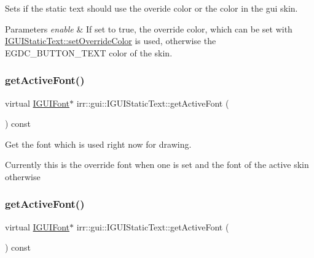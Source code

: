 Sets if the static text should use the overide color or the color in the gui skin. 


\begin{DoxyParams}{Parameters}
{\em enable} & If set to true, the override color, which can be set with \hyperlink{classirr_1_1gui_1_1IGUIStaticText_aadc1f0e10e4b298944e6dcfd49e54009}{I\+G\+U\+I\+Static\+Text\+::set\+Override\+Color} is used, otherwise the E\+G\+D\+C\+\_\+\+B\+U\+T\+T\+O\+N\+\_\+\+T\+E\+XT color of the skin. \\
\hline
\end{DoxyParams}
\mbox{\label{classirr_1_1gui_1_1IGUIStaticText_aef001eb5d0e13b5b6d1efead606605c2}} 
\subsubsection{\texorpdfstring{get\+Active\+Font()}{getActiveFont()}\hspace{0.1cm}{\footnotesize\ttfamily [1/2]}}
{\footnotesize\ttfamily virtual \hyperlink{classirr_1_1gui_1_1IGUIFont}{I\+G\+U\+I\+Font}$\ast$ irr\+::gui\+::\+I\+G\+U\+I\+Static\+Text\+::get\+Active\+Font (\begin{DoxyParamCaption}{ }\end{DoxyParamCaption}) const\hspace{0.3cm}{\ttfamily [pure virtual]}}



Get the font which is used right now for drawing. 

Currently this is the override font when one is set and the font of the active skin otherwise \mbox{\label{classirr_1_1gui_1_1IGUIStaticText_aef001eb5d0e13b5b6d1efead606605c2}} 
\subsubsection{\texorpdfstring{get\+Active\+Font()}{getActiveFont()}\hspace{0.1cm}{\footnotesize\ttfamily [2/2]}}
{\footnotesize\ttfamily virtual \hyperlink{classirr_1_1gui_1_1IGUIFont}{I\+G\+U\+I\+Font}$\ast$ irr\+::gui\+::\+I\+G\+U\+I\+Static\+Text\+::get\+Active\+Font (\begin{DoxyParamCaption}{ }\end{DoxyParamCaption}) const\hspace{0.3cm}{\ttfamily [pure virtual]}}




